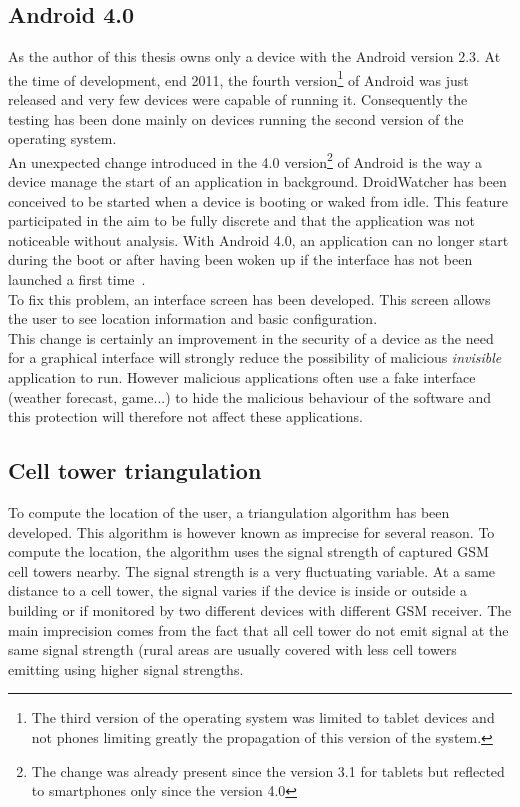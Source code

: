 \subsection{Android 4.0}
\label{sec:dw-ics}

As the author of this thesis owns only a device with the Android version 2.3.
At the time of development, end 2011, the fourth version\footnote{The third version of the operating system was limited to tablet devices and not phones limiting greatly the propagation of this version of the system.} of Android was just released and very few devices were capable of running it.
Consequently the testing has been done mainly on devices running the second version of the operating system.\\

An unexpected change introduced in the 4.0 version\footnote{The change was already present since the version 3.1 for tablets but reflected to smartphones only since the version 4.0} of Android is the way a device manage the start of an application in background.
DroidWatcher has been conceived to be started when a device is booting or waked from idle.
This feature participated in the aim to be fully discrete and that the application was not noticeable without analysis.
With Android 4.0, an application can no longer start during the boot or after having been woken up if the interface has not been launched a first time~\cite{boot-restrictions}.\\

To fix this problem, an interface screen has been developed.
This screen allows the user to see location information and basic configuration.\\

This change is certainly an improvement in the security of a device as the need for a graphical interface will strongly reduce the possibility of malicious \emph{invisible} application to run.
However malicious applications often use a fake interface (weather forecast, game...) to hide the malicious behaviour of the software and this protection will therefore not affect these applications.

\subsection{Cell tower triangulation}
\label{sec:dw-difficult-cell}

To compute the location of the user, a triangulation algorithm has been developed.
This algorithm is however known as imprecise for several reason.
To compute the location, the algorithm uses the signal strength of captured GSM cell towers nearby.
The signal strength is a very fluctuating variable.
At a same distance to a cell tower, the signal varies if the device is inside or outside a building or if monitored by two different devices with different GSM receiver.
The main imprecision comes from the fact that all cell tower do not emit signal at the same signal strength (rural areas are usually covered with less cell towers emitting using higher signal strengths.\\

